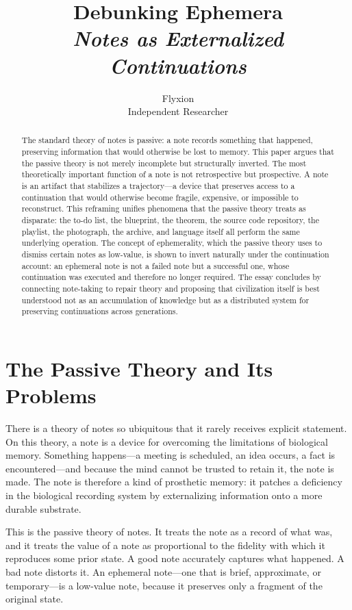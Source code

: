 \documentclass[12pt, a4paper]{article}
\title{\textbf{Debunking Ephemera}\\[0.5em]
\large\textit{Notes as Externalized Continuations}}
\author{Flyxion\\[0.3em]\small Independent Researcher}
\date{}
\begin{document}
\maketitle
\thispagestyle{empty}

\begin{abstract}
\noindent
The standard theory of notes is passive: a note records something that happened,
preserving information that would otherwise be lost to memory. This paper argues
that the passive theory is not merely incomplete but structurally inverted. The
most theoretically important function of a note is not retrospective but
prospective. A note is an artifact that stabilizes a trajectory---a device that
preserves access to a continuation that would otherwise become fragile, expensive,
or impossible to reconstruct. This reframing unifies phenomena that the passive
theory treats as disparate: the to-do list, the blueprint, the theorem, the source
code repository, the playlist, the photograph, the archive, and language itself
all perform the same underlying operation. The concept of ephemerality, which the
passive theory uses to dismiss certain notes as low-value, is shown to invert
naturally under the continuation account: an ephemeral note is not a failed note
but a successful one, whose continuation was executed and therefore no longer
required. The essay concludes by connecting note-taking to repair theory and
proposing that civilization itself is best understood not as an accumulation of
knowledge but as a distributed system for preserving continuations across
generations.
\end{abstract}

\newpage

\section{The Passive Theory and Its Problems}

There is a theory of notes so ubiquitous that it rarely receives explicit
statement. On this theory, a note is a device for overcoming the limitations of
biological memory. Something happens---a meeting is scheduled, an idea occurs, a
fact is encountered---and because the mind cannot be trusted to retain it, the
note is made. The note is therefore a kind of prosthetic memory: it patches a
deficiency in the biological recording system by externalizing information onto a
more durable substrate.

This is the passive theory of notes. It treats the note as a record of what was,
and it treats the value of a note as proportional to the fidelity with which it
reproduces some prior state. A good note accurately captures what happened. A bad
note distorts it. An ephemeral note---one that is brief, approximate, or
temporary---is a low-value note, because it preserves only a fragment of the
original state.
\end{document}
